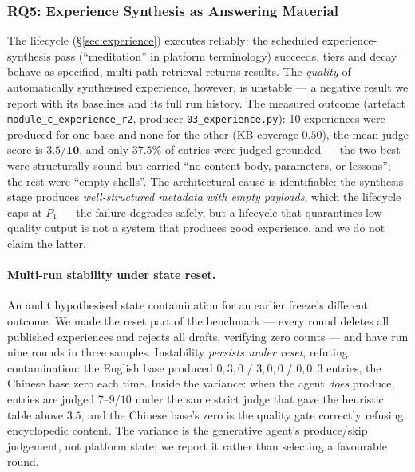 \documentclass[sigconf, review, anonymous]{acmart}
\begin{document}
\subsubsection{RQ5: Experience Synthesis as Answering Material}\label{sec:exp-analysis}
The lifecycle (\S\ref{sec:experience}) executes reliably: the scheduled
experience-synthesis pass (``meditation'' in platform terminology) succeeds,
tiers and decay behave as specified, multi-path retrieval
returns results. The \emph{quality} of automatically synthesised experience,
however, is unstable --- a negative result we report with its baselines and
its full run history. The measured outcome (artefact
\texttt{module\_c\_experience\_r2}, producer \texttt{03\_experience.py}):
10 experiences were produced for one base and none for the other (KB coverage
$0.50$), the mean judge score is $\mathbf{3.5/10}$, and only $37.5\%$ of
entries were judged grounded --- the two best were structurally sound but
carried ``no content body, parameters, or lessons''; the rest were ``empty
shells''. The architectural cause is identifiable: the synthesis stage
produces \emph{well-structured metadata with empty payloads}, which the
lifecycle caps at $P_1$ --- the failure degrades safely, but a lifecycle that
quarantines low-quality output is not a system that produces good experience,
and we do not claim the latter.

\paragraph{Multi-run stability under state reset.}
An audit hypothesised state contamination for an earlier freeze's different
outcome. We made the reset part of the benchmark --- every round
deletes all published experiences and rejects all drafts, verifying zero
counts --- and have run nine rounds in three samples. Instability \emph{persists
under reset}, refuting contamination: the English base produced
$0,3,0$ / $3,0,0$ / $0,0,3$ entries, the Chinese base zero each time. Inside
the variance: when the agent \emph{does} produce, entries are judged
$7$--$9/10$ under the same strict judge that gave the heuristic table above
$3.5$, and the Chinese base's zero is the quality gate correctly refusing
encyclopedic content. The variance is the generative agent's produce/skip
judgement, not platform state; we report it rather than selecting a favourable
round.
\end{document}

